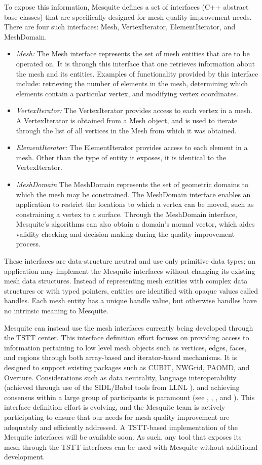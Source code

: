 \documentclass[psfig]{article}
\begin{document}
To expose this information, Mesquite defines a set of interfaces 
(C++ abstract base classes) that are specifically designed for mesh
quality improvement needs.  There are four such interfaces: Mesh,
VertexIterator, ElementIterator, and MeshDomain.
\begin{itemize}
\item {\it Mesh:} The Mesh interface represents the set of mesh
entities that are to be operated on.  It is through this interface
that one retrieves information about the mesh and its entities.
Examples of functionality provided by this interface include:
retrieving the number of elements in the mesh, determining which
elements contain a particular vertex, and modifying vertex
coordinates.
\item {\it VertexIterator:} The VertexIterator provides access to each
vertex in a mesh.  A VertexIterator is obtained from a Mesh object,
and is used to iterate through the list of all vertices in the Mesh
from which it was obtained.
\item {\it ElementIterator:} The ElementIterator provides access to
each element in a mesh.  Other than the type of entity it exposes, it
is identical to the VertexIterator.
\item {\it MeshDomain} The MeshDomain represents the set of geometric
domains to which the mesh may be constrained.  The MeshDomain
interface enables an application to restrict the locations to which a
vertex can be moved, such as constraining a vertex to a surface.
Through the MeshDomain interface, Mesquite's algorithms can also
obtain a domain's normal vector, which aides validity checking and 
decision making during the quality improvement process.
\end{itemize}
These interfaces are data-structure neutral and use only primitive
data types; an application may implement the Mesquite interfaces
without changing its existing mesh data structures.  Instead of
representing mesh entities with complex data structures or with typed
pointers, entities are identified with opaque values called handles.
Each mesh entity has a unique handle value, but otherwise handles have
no intrinsic meaning to Mesquite.  

Mesquite can instead use the mesh interfaces currently
being developed through the TSTT center.  This interface definition
effort focuses on providing access to information pertaining to low
level mesh objects such as vertices, edges, faces, and regions through
both array-based and iterator-based mechanisms.  It is designed to
support existing packages such as CUBIT, NWGrid, PAOMD, and Overture.
Considerations such as data neutrality, language interoperability
(achieved through use of the SIDL/Babel tools from LLNL \cite{babel}),
and achieving consensus within a large group of participants is
paramount (see \cite{Cubit-website}, \cite{overture}, \cite{aomd-imr},
and \cite{NWGrid-website}).  This interface definition effort is
evolving, and the Mesquite team is actively participating to ensure
that our needs for mesh quality improvement are adequately and
efficiently addressed.  A TSTT-based implementation of the Mesquite
interfaces will be available soon.  As such, any tool that exposes its
mesh through the TSTT interfaces can be used with Mesquite without
additional development.
\end{document}
